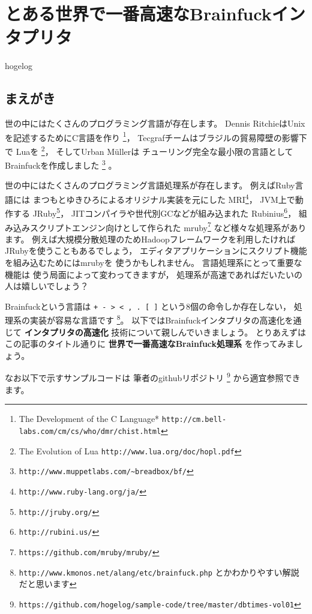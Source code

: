 

\chapter{とある世界で一番高速なBrainfuckインタプリタ}
\begin{flushright}
hogelog
\end{flushright}

\section{まえがき}
\lettrine{世}
の中にはたくさんのプログラミング言語が存在します。
Dennis RitchieはUnixを記述するためにC言語を作り
\footnote{The Development of the C Language* 
\verb|http://cm.bell-labs.com/cm/cs/who/dmr/chist.html|
}，
Tecgrafチームはブラジルの貿易障壁の影響下で
Luaを
\footnote{
The Evolution of Lua
\verb|http://www.lua.org/doc/hopl.pdf|
}，
そしてUrban M\"ullerは
チューリング完全な最小限の言語として
Brainfuckを作成しました
\footnote{
\verb|http://www.muppetlabs.com/~breadbox/bf/|
}
。

世の中にはたくさんのプログラミング言語処理系が存在します。
例えばRuby言語には
まつもとゆきひろによるオリジナル実装を元にした
MRI\footnote{
\verb|http://www.ruby-lang.org/ja/|
}，
JVM上で動作する
JRuby\footnote{
\verb|http://jruby.org/|
}，
JITコンパイラや世代別GCなどが組み込まれた
Rubinius\footnote{
\verb|http://rubini.us/|
}，
組み込みスクリプトエンジン向けとして作られた
mruby\footnote{
\verb|https://github.com/mruby/mruby/|
}
など様々な処理系があります。
例えば大規模分散処理のためHadoopフレームワークを利用したければ
JRubyを使うこともあるでしょう，
エディタアプリケーションにスクリプト機能を組み込むためにはmrubyを
使うかもしれません。
言語処理系にとって重要な機能は
使う局面によって変わってきますが，
処理系が高速であればだいたいの人は嬉しいでしょう？

Brainfuckという言語は
\verb|+ - > < , . [ ]|
という8個の命令しか存在しない，
処理系の実装が容易な言語です
\footnote{
\verb|http://www.kmonos.net/alang/etc/brainfuck.php|
とかわかりやすい解説だと思います
}。
以下ではBrainfuckインタプリタの高速化を通じて
\textbf{インタプリタの高速化}
技術について親しんでいきましょう。
とりあえずはこの記事のタイトル通りに
{\Large \textbf{世界で一番高速なBrainfuck処理系}}
を作ってみましょう。

なお以下で示すサンプルコードは
筆者のgithubリポジトリ
\footnote{\verb|https://github.com/hogelog/sample-code/tree/master/dbtimes-vol01|}
から適宜参照できます。

